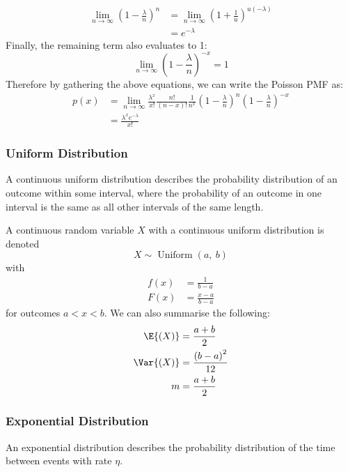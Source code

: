 \documentclass{article}
\begin{document}
\begin{align*}
    \lim_{n \to \infty} \left( 1 - \frac{\lambda}{n} \right)^n & = \lim_{n \to \infty} \left( 1 + \frac{1}{u} \right)^{u \left( -\lambda \right)} \\
                                                               & = e^{-\lambda}
\end{align*}
Finally, the remaining term also evaluates to 1:
\begin{equation*}
    \lim_{n \to \infty} \left( 1 - \frac{\lambda}{n} \right)^{-x} = 1
\end{equation*}
Therefore by gathering the above equations, we can write the Poisson PMF as:
\begin{align*}
    p\left( x \right) & = \lim_{n \to \infty} \frac{\lambda^x}{x!} \frac{n!}{\left( n - x \right)!} \frac{1}{n^x} \left( 1 - \frac{\lambda}{n} \right)^n \left( 1 - \frac{\lambda}{n} \right)^{-x} \\
                      & = \frac{\lambda^x e^{-\lambda}}{x!}
\end{align*}
\subsubsection{Uniform Distribution}
A continuous uniform distribution describes the probability distribution of an outcome within some
interval, where the probability of an outcome in one interval is the same as all other intervals of the same length.

A continuous random variable \(X\) with a continuous uniform distribution is denoted
\begin{equation*}
    X \sim \operatorname{Uniform}{\left( a,\: b \right)}
\end{equation*}
with
\begin{align*}
    f\left( x \right) & = \frac{1}{b - a}     \\
    F\left( x \right) & = \frac{x - a}{b - a}
\end{align*}
for outcomes \(a < x < b\).
We can also summarise the following:
\begin{align*}
    \E{\left( X \right)}   & = \frac{a + b}{2}                   \\
    \Var{\left( X \right)} & = \frac{\left( b - a \right)^2}{12} \\
    m                      & = \frac{a + b}{2}
\end{align*}
\subsubsection{Exponential Distribution}
An exponential distribution describes the probability distribution of the time between events with rate \(\eta\).
\end{document}
